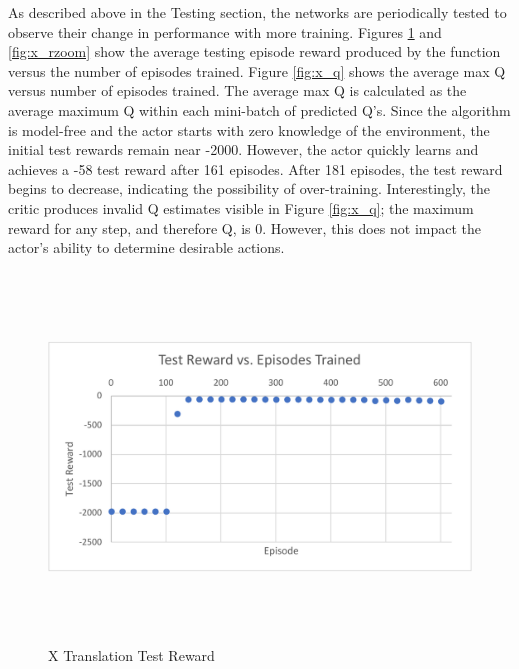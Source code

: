As described above in the Testing section, the networks are periodically tested to observe their change in performance with more training. Figures \ref{fig:x_r} and \ref{fig:x_rzoom} show the average testing episode reward produced by the \mbox{} function versus the number of episodes trained. Figure \ref{fig:x_q} shows the average max Q versus number of episodes trained. The average max Q is calculated as the average maximum Q within each mini-batch of predicted Q's. Since the algorithm is model-free and the actor starts with zero knowledge of the environment, the initial test rewards remain near -2000. However, the actor quickly learns and achieves a -58 test reward after 161 episodes. After 181 episodes, the test reward begins to decrease, indicating the possibility of over-training. Interestingly, the critic produces invalid Q estimates visible in Figure \ref{fig:x_q}; the maximum reward for any step, and therefore Q, is 0. However, this does not impact the actor's ability to determine desirable actions.
\begin{figure}[H]
	\centering
	\includegraphics[width=6in, height=3.85in, keepaspectratio]{figures/train_figs/x_r.pdf}
	\caption{X Translation Test Reward} \label{fig:x_r}
\end{figure}
